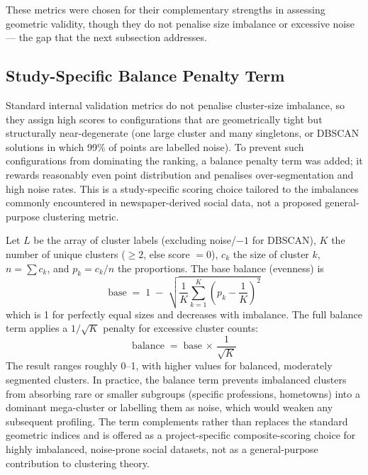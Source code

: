 These metrics were chosen for their complementary strengths in assessing geometric validity, though they do not penalise size imbalance or excessive noise --- the gap that the next subsection addresses.

\subsection{Study-Specific Balance Penalty Term}

Standard internal validation metrics do not penalise cluster-size imbalance, so they assign high scores to configurations that are geometrically tight but structurally near-degenerate (one large cluster and many singletons, or DBSCAN solutions in which 99\% of points are labelled noise). To prevent such configurations from dominating the ranking, a balance penalty term was added; it rewards reasonably even point distribution and penalises over-segmentation and high noise rates. This is a study-specific scoring choice tailored to the imbalances commonly encountered in newspaper-derived social data, not a proposed general-purpose clustering metric.

Let $L$ be the array of cluster labels (excluding noise/$-1$ for DBSCAN), $K$ the number of unique clusters ($\geq 2$, else score $= 0$), $c_k$ the size of cluster $k$, $n = \sum c_k$, and $p_k = c_k / n$ the proportions. The base balance (evenness) is
\begin{equation}\label{eq:balance_base}
\text{base} \;=\; 1 \;-\; \sqrt{\frac{1}{K} \sum_{k=1}^{K} \left( p_k - \frac{1}{K} \right)^{\!2}}
\end{equation}
which is 1 for perfectly equal sizes and decreases with imbalance. The full balance term applies a $1/\sqrt{K}$ penalty for excessive cluster counts:
\begin{equation}\label{eq:balance}
\text{balance} \;=\; \text{base} \,\times\, \frac{1}{\sqrt{K}}
\end{equation}
The result ranges roughly 0--1, with higher values for balanced, moderately segmented clusters. In practice, the balance term prevents imbalanced clusters from absorbing rare or smaller subgroups (specific professions, hometowns) into a dominant mega-cluster or labelling them as noise, which would weaken any subsequent profiling. The term complements rather than replaces the standard geometric indices and is offered as a project-specific composite-scoring choice for highly imbalanced, noise-prone social datasets, not as a general-purpose contribution to clustering theory.

